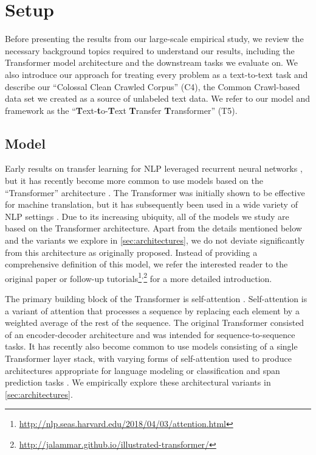 \section{Setup}
\label{sec:setup}

Before presenting the results from our large-scale empirical study, we review the necessary background topics required to understand our results, including the Transformer model architecture and the downstream tasks we evaluate on. We also introduce our approach for treating every problem as a text-to-text task and describe our ``Colossal Clean Crawled Corpus'' (C4), the Common Crawl-based data set we created as a source of unlabeled text data. We refer to our model and framework as the ``\textbf{T}ext-\textbf{t}o-\textbf{T}ext \textbf{T}ransfer \textbf{T}ransformer'' (T5).

\subsection{Model}
\label{sec:model}

Early results on transfer learning for NLP leveraged recurrent neural networks \citep{peters2018deep,howard2018universal}, but it has recently become more common to use models based on the ``Transformer'' architecture \citep{vaswani2017attention}. The Transformer was initially shown to be effective for machine translation, but it has subsequently been used in a wide variety of NLP settings \citep{radford2018improving,devlin2018bert,mccann2018natural,yu2018qanet}. Due to its increasing ubiquity, all of the models we study are based on the Transformer architecture. Apart from the details mentioned below and the variants we explore in \ref{sec:architectures}, we do not deviate significantly from this architecture as originally proposed. Instead of providing a comprehensive definition of this model, we refer the interested reader to the original paper \citep{vaswani2017attention} or follow-up tutorials\footnote{\url{http://nlp.seas.harvard.edu/2018/04/03/attention.html}}\textsuperscript{,}\footnote{\url{http://jalammar.github.io/illustrated-transformer/}} for a more detailed introduction.

The primary building block of the Transformer is self-attention \citep{cheng2016long}. Self-attention is a variant of attention \citep{graves2013generating,bahdanau2014neural} that processes a sequence by replacing each element by a weighted average of the rest of the sequence. The original Transformer consisted of an encoder-decoder architecture and was intended for sequence-to-sequence \citep{sutskever2014sequence,kalchbrenner2014convolutional} tasks. It has recently also become common to use models consisting of a single Transformer layer stack, with varying forms of self-attention used to produce architectures appropriate for language modeling \citep{radford2018improving,al2019character} or classification and span prediction tasks \citep{devlin2018bert,yang2019xlnet}. We empirically explore these architectural variants in \ref{sec:architectures}.

